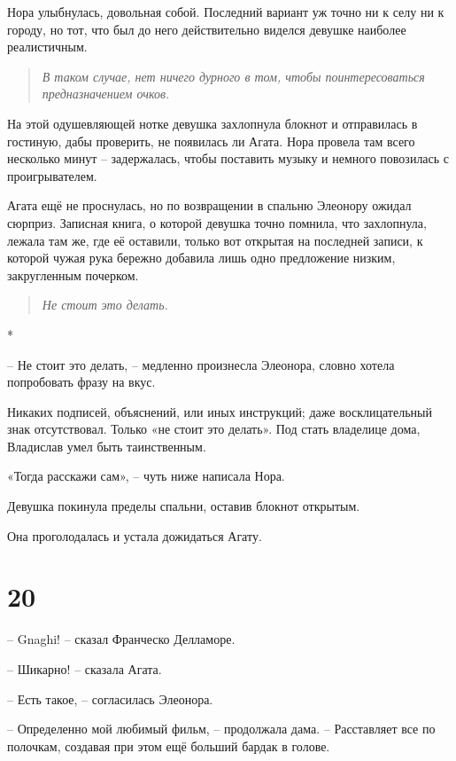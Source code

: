 \documentclass[
  a5paperpaper,
  DIV=11,
  numbers=noendperiod]{scrreprt}
\begin{document}
Нора улыбнулась, довольная собой. Последний вариант уж точно ни к селу
ни к городу, но тот, что был до него действительно виделся девушке
наиболее реалистичным.

\begin{quote}
\emph{В таком случае, нет ничего дурного в том, чтобы поинтересоваться
предназначением очков.}
\end{quote}

На этой одушевляющей нотке девушка захлопнула блокнот и отправилась в
гостиную, дабы проверить, не появилась ли Агата. Нора провела там всего
несколько минут -- задержалась, чтобы поставить музыку и немного
повозилась с проигрывателем.

Агата ещё не проснулась, но по возвращении в спальню Элеонору ожидал
сюрприз. Записная книга, о которой девушка точно помнила, что
захлопнула, лежала там же, где её оставили, только вот открытая на
последней записи, к которой чужая рука бережно добавила лишь одно
предложение низким, закругленным почерком.

\begin{quote}
\emph{Не стоит это делать.}
\end{quote}

*

-- Не стоит это делать, -- медленно произнесла Элеонора, словно хотела
попробовать фразу на вкус.

Никаких подписей, объяснений, или иных инструкций; даже восклицательный
знак отсутствовал. Только «не стоит это делать». Под стать владелице
дома, Владислав умел быть таинственным.

«Тогда расскажи сам», -- чуть ниже написала Нора.

Девушка покинула пределы спальни, оставив блокнот открытым.

Она проголодалась и устала дожидаться Агату.

\section*{20}\label{20}


-- Gnaghi! -- сказал Франческо Делламоре.

-- Шикарно! -- сказала Агата.

-- Есть такое, -- согласилась Элеонора.

-- Определенно мой любимый фильм, -- продолжала дама. -- Расставляет все
по полочкам, создавая при этом ещё больший бардак в голове.
\end{document}
